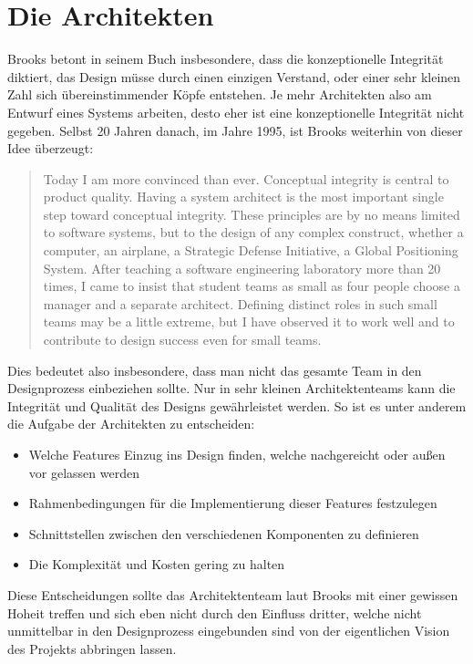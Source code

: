 \documentclass[a4paper, ngerman, 12pt, usenames, dvipsnames]{article}
\begin{document}
\section{Die Architekten}
Brooks betont in seinem Buch insbesondere, dass die konzeptionelle Integrität diktiert, das Design müsse durch einen einzigen Verstand, oder einer sehr kleinen Zahl sich übereinstimmender Köpfe entstehen. Je mehr Architekten also am Entwurf eines Systems arbeiten, desto eher ist eine konzeptionelle Integrität nicht gegeben.
Selbst 20 Jahren danach, im Jahre 1995, ist Brooks weiterhin von dieser Idee überzeugt: 
\begin{quote}
    Today I am more convinced than ever. Conceptual integrity is central to product quality. Having a system architect is the most important single step toward conceptual integrity. These principles are by no means limited to software systems, but to the design of any complex construct, whether a computer, an airplane, a Strategic Defense Initiative, a Global Positioning System. After teaching a software engineering laboratory more than 20 times, I came to insist that student teams as small as four people choose a manager and a separate architect. Defining distinct roles in such small teams may be a little extreme, but I have observed it to work well and to contribute to design success even for small teams. \cite{wikic2:conceptual_integrity}
\end{quote}
Dies bedeutet also insbesondere, dass man nicht das gesamte Team in den Designprozess einbeziehen sollte. Nur in sehr kleinen Architektenteams kann die Integrität und Qualität des Designs gewährleistet werden.
So ist es unter anderem die Aufgabe der Architekten zu entscheiden:
\begin{itemize}
    \item Welche Features Einzug ins Design finden, welche nachgereicht oder außen vor gelassen werden
    \item Rahmenbedingungen für die Implementierung dieser Features festzulegen
    \item Schnittstellen zwischen den verschiedenen Komponenten zu definieren
    \item Die Komplexität und Kosten gering zu halten
\end{itemize}
Diese Entscheidungen sollte das Architektenteam laut Brooks mit einer gewissen Hoheit treffen und sich eben nicht durch den Einfluss dritter, welche nicht unmittelbar in den Designprozess eingebunden sind von der eigentlichen Vision des Projekts abbringen lassen. 
\end{document}
